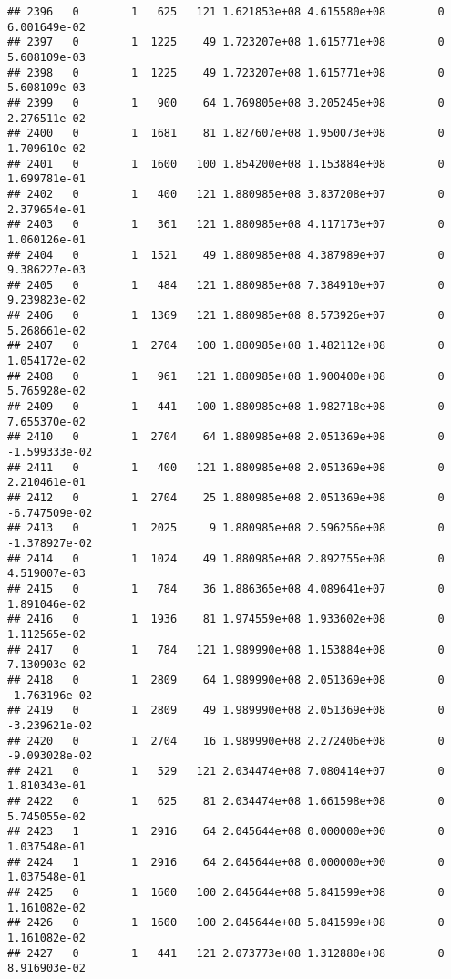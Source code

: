 \documentclass[
]{article}
\begin{document}
\begin{enumerate}
\begin{verbatim}
## 2396   0        1   625   121 1.621853e+08 4.615580e+08        0  6.001649e-02
## 2397   0        1  1225    49 1.723207e+08 1.615771e+08        0  5.608109e-03
## 2398   0        1  1225    49 1.723207e+08 1.615771e+08        0  5.608109e-03
## 2399   0        1   900    64 1.769805e+08 3.205245e+08        0  2.276511e-02
## 2400   0        1  1681    81 1.827607e+08 1.950073e+08        0  1.709610e-02
## 2401   0        1  1600   100 1.854200e+08 1.153884e+08        0  1.699781e-01
## 2402   0        1   400   121 1.880985e+08 3.837208e+07        0  2.379654e-01
## 2403   0        1   361   121 1.880985e+08 4.117173e+07        0  1.060126e-01
## 2404   0        1  1521    49 1.880985e+08 4.387989e+07        0  9.386227e-03
## 2405   0        1   484   121 1.880985e+08 7.384910e+07        0  9.239823e-02
## 2406   0        1  1369   121 1.880985e+08 8.573926e+07        0  5.268661e-02
## 2407   0        1  2704   100 1.880985e+08 1.482112e+08        0  1.054172e-02
## 2408   0        1   961   121 1.880985e+08 1.900400e+08        0  5.765928e-02
## 2409   0        1   441   100 1.880985e+08 1.982718e+08        0  7.655370e-02
## 2410   0        1  2704    64 1.880985e+08 2.051369e+08        0 -1.599333e-02
## 2411   0        1   400   121 1.880985e+08 2.051369e+08        0  2.210461e-01
## 2412   0        1  2704    25 1.880985e+08 2.051369e+08        0 -6.747509e-02
## 2413   0        1  2025     9 1.880985e+08 2.596256e+08        0 -1.378927e-02
## 2414   0        1  1024    49 1.880985e+08 2.892755e+08        0  4.519007e-03
## 2415   0        1   784    36 1.886365e+08 4.089641e+07        0  1.891046e-02
## 2416   0        1  1936    81 1.974559e+08 1.933602e+08        0  1.112565e-02
## 2417   0        1   784   121 1.989990e+08 1.153884e+08        0  7.130903e-02
## 2418   0        1  2809    64 1.989990e+08 2.051369e+08        0 -1.763196e-02
## 2419   0        1  2809    49 1.989990e+08 2.051369e+08        0 -3.239621e-02
## 2420   0        1  2704    16 1.989990e+08 2.272406e+08        0 -9.093028e-02
## 2421   0        1   529   121 2.034474e+08 7.080414e+07        0  1.810343e-01
## 2422   0        1   625    81 2.034474e+08 1.661598e+08        0  5.745055e-02
## 2423   1        1  2916    64 2.045644e+08 0.000000e+00        0  1.037548e-01
## 2424   1        1  2916    64 2.045644e+08 0.000000e+00        0  1.037548e-01
## 2425   0        1  1600   100 2.045644e+08 5.841599e+08        0  1.161082e-02
## 2426   0        1  1600   100 2.045644e+08 5.841599e+08        0  1.161082e-02
## 2427   0        1   441   121 2.073773e+08 1.312880e+08        0  8.916903e-02

\end{verbatim}
\end{enumerate}
\end{document}
